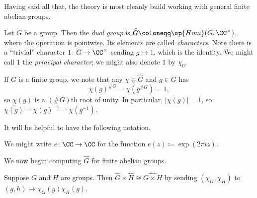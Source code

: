 \documentclass[../notes.tex]{subfiles}
\begin{document}
Having said all that, the theory is most cleanly build working with general finite abelian groups.
\begin{definition} 
	Let $G$ be a group. Then the \textit{dual group} is $\widehat{G}\coloneqq\op{Hom}(G,\CC^\times)$, where the operation is pointwise. Its elements are called \textit{characters}. Note there is a ``trivial'' character $1\colon G\to\CC^\times$ sending $g\mapsto1$, which is the identity. We might call $1$ the \textit{principal character}; we might also denote $1$ by $\chi_0$.
\end{definition}
\begin{remark} \label{rem:chars-to-s1}
	If $G$ is a finite group, we note that any $\chi\in \widehat{G}$ and $g\in G$ has
	\[\chi(g)^{\#G}=\chi\left(g^{\#G}\right)=1,\]
	so $\chi(g)$ is a $(\#G)$th root of unity. In particular, $|\chi(g)|=1$, so $\overline{\chi(g)}=\chi(g)^{-1}=\chi\left(g^{-1}\right)$.
\end{remark}
It will be helpful to have the following notation.
\begin{notation}
	We might write $e\colon\CC\to\CC$ for the function $e(z)\coloneqq\exp(2\pi iz)$.
\end{notation}
We now begin computing $\widehat{G}$ for finite abelian groups.
\begin{lemma} \label{lem:prod-dual}
	Suppose $G$ and $H$ are groups. Then $\widehat{G}\times \widehat{H}\cong\widehat{G\times H}$ by sending $(\chi_G,\chi_H)$ to $(g,h)\mapsto\chi_G(g)\chi_H(g)$.
\end{lemma}
\end{document}
